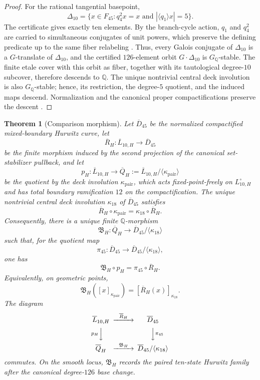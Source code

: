 \documentclass[11pt]{article}
\newtheorem{theorem}{Theorem}[section]
\theoremstyle{remark}
\newcommand{\Q}{\mathbb Q}
\begin{document}
\begin{proof}
For the rational tangential basepoint,
\[
 \Delta_{10}=\{x\in F_{45}:q_4^2x=x\text{ and }|\langle q_1\rangle x|=5\}.
\]
The certificate gives exactly ten elements.  By the branch-cycle action, $q_1$ and $q_4^2$ are carried to simultaneous conjugates of unit powers, which preserve the defining predicate up to the same fiber relabeling \cite{FriedVolklein}.  Thus, every Galois conjugate of $\Delta_{10}$ is a $G$-translate of $\Delta_{10}$, and the certified $126$-element orbit $G\cdot\Delta_{10}$ is $G_{\Q}$-stable.  The finite etale cover with this orbit as fiber, together with its tautological degree-$10$ subcover, therefore descends to $\Q$.  The unique nontrivial central deck involution is also $G_{\Q}$-stable; hence, its restriction, the degree-$5$ quotient, and the induced maps descend.  Normalization and the canonical proper compactifications preserve the descent \cite{Seguin}.
\end{proof}

\begin{theorem}[Comparison morphism]
\label{thm:comparison-morphism-final}
Let $\overline D_{45}$ be the normalized compactified mixed-boundary Hurwitz curve, let
\[
 \overline R_H:\overline L_{10,H}\longrightarrow\overline D_{45}
\]
be the finite morphism induced by the second projection of the canonical set-stabilizer pullback, and let
\[
 p_H:\overline L_{10,H}\longrightarrow
 \overline Q_H:=\overline L_{10,H}/\langle\kappa_{\mathrm{pair}}\rangle
\]
be the quotient by the deck involution $\kappa_{\mathrm{pair}}$, which acts fixed-point-freely on $L_{10,H}^\circ$ and has total boundary ramification $12$ on the compactification.  The unique nontrivial central deck involution $\kappa_{18}$ of $\overline D_{45}$ satisfies
\[
 \boxed{
 \overline R_H\circ\kappa_{\mathrm{pair}}
 =
 \kappa_{18}\circ\overline R_H.
 }
\]
Consequently, there is a unique finite $\Q$-morphism
\[
 \boxed{
 \mathfrak B_H:\overline Q_H
 \longrightarrow
 \overline D_{45}/\langle\kappa_{18}\rangle
 }
\]
such that, for the quotient map
\[
 \pi_{45}:\overline D_{45}
 \longrightarrow
 \overline D_{45}/\langle\kappa_{18}\rangle,
\]
one has
\[
 \boxed{
 \mathfrak B_H\circ p_H
 =
 \pi_{45}\circ\overline R_H.
 }
\]
Equivalently, on geometric points,
\[
 \boxed{
 \mathfrak B_H([x]_{\kappa_{\mathrm{pair}}})
 =
 [\overline R_H(x)]_{\kappa_{18}}.
 }
\]
The diagram
\[
\begin{CD}
 \overline L_{10,H} @>{\overline R_H}>> \overline D_{45}\\
 @V{p_H}VV @VV{\pi_{45}}V\\
 \overline Q_H @>{\mathfrak B_H}>> \overline D_{45}/\langle\kappa_{18}\rangle
\end{CD}
\]
commutes.  On the smooth locus, $\mathfrak B_H$ records the paired ten-state Hurwitz family after the canonical degree-$126$ base change.
\end{theorem}
\end{document}
